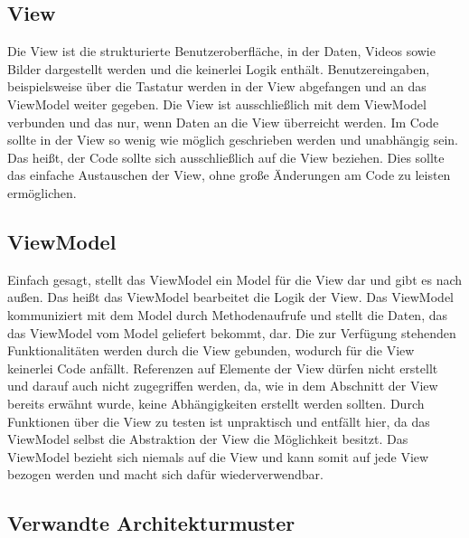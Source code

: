 \subsection*{View}
Die View ist die strukturierte Benutzeroberfl\"ache, in der Daten, Videos sowie Bilder dargestellt werden und die keinerlei Logik enth\"alt. Benutzereingaben, beispielsweise \"uber die Tastatur werden in der View abgefangen und an das ViewModel weiter gegeben. Die View ist ausschlie\ss{}lich mit dem ViewModel verbunden und das nur, wenn Daten an die View \"uberreicht werden. Im Code sollte in der View so wenig wie m\"oglich geschrieben werden und unabh\"angig sein. Das hei\ss{}t, der Code sollte sich ausschlie\ss{}lich auf die View beziehen. Dies sollte das einfache Austauschen der View, ohne gro\ss{}e \"Anderungen am Code zu leisten erm\"oglichen\cite{EderView2017}.

\subsection*{ViewModel}
Einfach gesagt, stellt das ViewModel ein Model f\"ur die View dar und gibt es nach au\ss{}en. Das hei\ss{}t das ViewModel bearbeitet die Logik der View. 
Das ViewModel kommuniziert mit dem Model  durch Methodenaufrufe und stellt die Daten, das das ViewModel vom Model geliefert bekommt, dar. Die zur Verf\"ugung stehenden Funktionalit\"aten werden durch die View gebunden, wodurch f\"ur die View keinerlei Code anf\"allt.
Referenzen auf Elemente der View d\"urfen nicht erstellt und darauf auch nicht zugegriffen werden, da, wie in dem Abschnitt der View bereits erw\"ahnt wurde, keine Abh\"angigkeiten erstellt werden sollten. Durch Funktionen \"uber die View zu testen ist unpraktisch und entf\"allt hier, da das ViewModel selbst die Abstraktion der View die M\"oglichkeit besitzt.
Das ViewModel bezieht sich niemals auf die View und kann somit auf jede View bezogen werden und macht sich daf\"ur wiederverwendbar\cite{EderViewModel2017}.

\subsection{Verwandte Architekturmuster}

 
 
